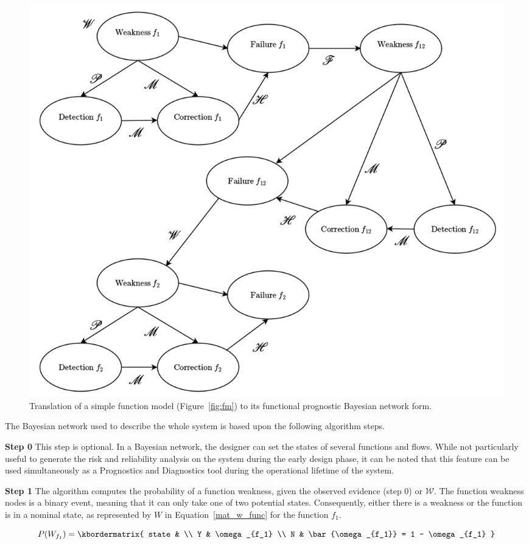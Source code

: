 \begin{figure}[H]
\centering
\includegraphics[scale=.3]{fig/bn_example}
\caption{Translation of a simple function model (Figure~\ref{fig:fm}) to its functional prognostic Bayesian network form.}
\label{fig:bn_example}
\end{figure}

The Bayesian network used to describe the whole system is based upon the following algorithm steps.

\textbf{Step 0}\hspace{5pt}
This step is optional. In a Bayesian network, the designer can set the states of several functions and flows. While not particularly useful to generate the risk and reliability analysis on the system during the early design phase, it can be noted that this feature can be used simultaneously as a Prognostics and Diagnostics tool during the operational lifetime of the system.


\textbf{Step 1}\hspace{5pt}
The algorithm computes the probability of a function weakness, given the observed evidence (step 0) or $\mathscr{W}$. The function weakness nodes is a binary event, meaning that it can only take one of two potential states. Consequently, either there is a weakness or the function is in a nominal state, as represented by $W$ in Equation~\ref{mat_w_func} for the function $f_1$.

\begin{equation}
  P(W_{f_1}) = \kbordermatrix{
    state  & \\
    Y & \omega_{f_1} \\
    N & \bar{\omega_{f_1}} = 1 - \omega_{f_1}
  }
\label{mat_w_func}
\end{equation}


